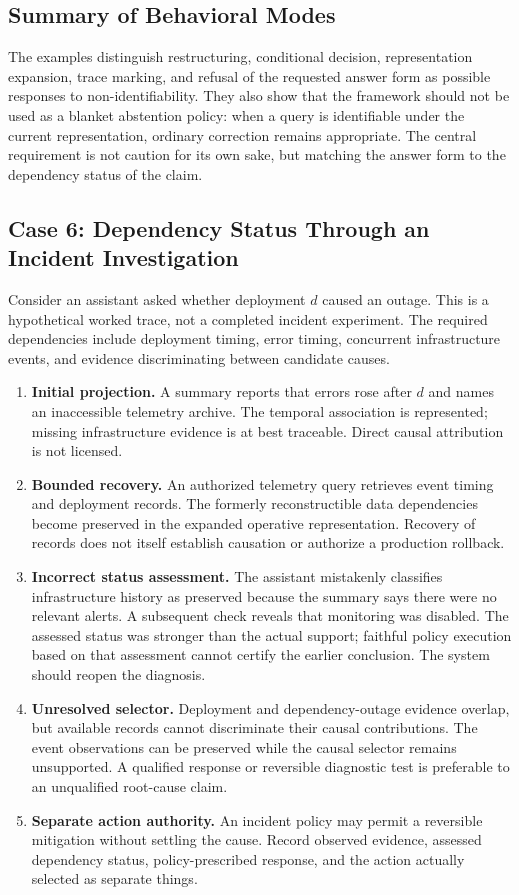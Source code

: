 \documentclass[11pt]{article}
\theoremstyle{definition}
\theoremstyle{remark}
\begin{document}
\subsection{Summary of Behavioral Modes}

The examples distinguish restructuring, conditional decision, representation expansion, trace marking, and refusal of the requested answer form as possible responses to non-identifiability. They also show that the framework should not be used as a blanket abstention policy: when a query is identifiable under the current representation, ordinary correction remains appropriate. The central requirement is not caution for its own sake, but matching the answer form to the dependency status of the claim.

\subsection{Case 6: Dependency Status Through an Incident Investigation}
\label{subsec:incident-status-lifecycle}

Consider an assistant asked whether deployment $d$ caused an outage. This is a hypothetical worked trace, not a completed incident experiment. The required dependencies include deployment timing, error timing, concurrent infrastructure events, and evidence discriminating between candidate causes.

\begin{enumerate}
\item \textbf{Initial projection.} A summary reports that errors rose after $d$ and names an inaccessible telemetry archive. The temporal association is represented; missing infrastructure evidence is at best traceable. Direct causal attribution is not licensed.
\item \textbf{Bounded recovery.} An authorized telemetry query retrieves event timing and deployment records. The formerly reconstructible data dependencies become preserved in the expanded operative representation. Recovery of records does not itself establish causation or authorize a production rollback.
\item \textbf{Incorrect status assessment.} The assistant mistakenly classifies infrastructure history as preserved because the summary says there were no relevant alerts. A subsequent check reveals that monitoring was disabled. The assessed status was stronger than the actual support; faithful policy execution based on that assessment cannot certify the earlier conclusion. The system should reopen the diagnosis.
\item \textbf{Unresolved selector.} Deployment and dependency-outage evidence overlap, but available records cannot discriminate their causal contributions. The event observations can be preserved while the causal selector remains unsupported. A qualified response or reversible diagnostic test is preferable to an unqualified root-cause claim.
\item \textbf{Separate action authority.} An incident policy may permit a reversible mitigation without settling the cause. Record observed evidence, assessed dependency status, policy-prescribed response, and the action actually selected as separate things.
\end{enumerate}
\end{document}

